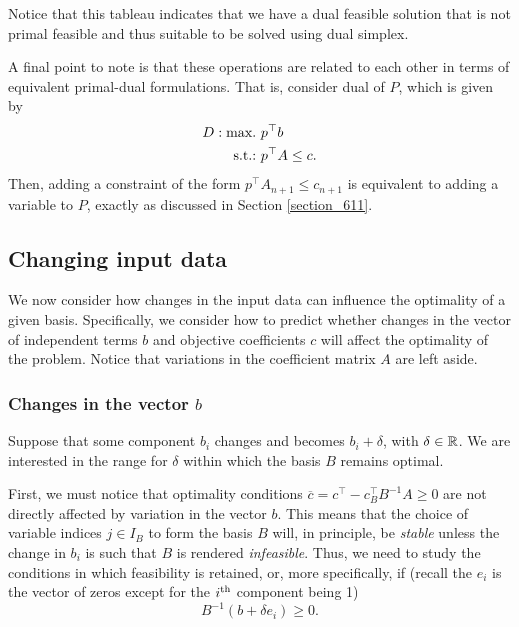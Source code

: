 Notice that this tableau indicates that we have a dual feasible solution that is not primal feasible and thus suitable to be solved using dual simplex.
	
A final point to note is that these operations are related to each other in terms of equivalent primal-dual formulations. That is, consider dual of $P$, which is given by
%
\begin{align*}
	D : \mathop{\text{max.~}}   & p^\top b \\
	\mathop{\text{s.t.:~}} 			& p^\top A \le c.
\end{align*}
%
Then, adding a constraint of the form $p^\top A_{n+1} \leq c_{n+1}$ is equivalent to adding a variable to $P$, exactly as discussed in Section \ref{section_611}.


\subsection{Changing input data} \label{section_613}

We now consider how changes in the input data can influence the optimality of a given basis. Specifically, we consider how to predict whether changes in the vector of independent terms $b$ and objective coefficients $c$ will affect the optimality of the problem. Notice that variations in the coefficient matrix $A$ are left aside.


\subsubsection{Changes in the vector $b$}

Suppose that some component $b_i$ changes and becomes $b_i + \delta$, with $\delta \in \mathbb{R}$. We are interested in the range for $\delta$ within which the basis $B$ remains optimal.

First, we must notice that optimality conditions $\overline{c} = c^\top - c^\top_B B^{-1}A \geq 0$ are not directly affected by variation in the vector $b$. This means that the choice of variable indices $j \in I_B$ to form the basis $B$ will, in principle, be \emph{stable} unless the change in $b_i$ is such that $B$ is rendered \emph{infeasible}. Thus, we need to study the conditions in which  feasibility is retained, or, more specifically, if (recall the $e_i$ is the vector of zeros except for the $i^\text{th}$ component being 1)
%
\begin{equation*}
	B^{-1}(b + \delta e_i) \geq 0.	
\end{equation*}

